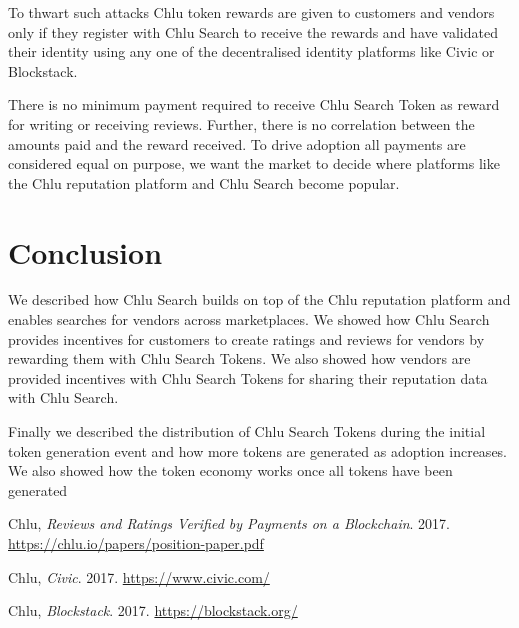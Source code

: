 \documentclass[a4paper]{article}
\begin{document}
To thwart such attacks Chlu token rewards are given to customers and
vendors only if they register with Chlu Search to receive the rewards
and have validated their identity using any one of the decentralised
identity platforms like Civic\cite{civic} or
Blockstack\cite{blockstack}.

There is no minimum payment required to receive Chlu Search Token as
reward for writing or receiving reviews. Further, there is no
correlation between the amounts paid and the reward received. To drive
adoption all payments are considered equal on purpose, we want the
market to decide where platforms like the Chlu reputation platform and
Chlu Search become popular.

\section{Conclusion}

We described how Chlu Search builds on top of the Chlu reputation
platform and enables searches for vendors across marketplaces. We
showed how Chlu Search provides incentives for customers to create
ratings and reviews for vendors by rewarding them with Chlu Search
Tokens. We also showed how vendors are provided incentives with Chlu
Search Tokens for sharing their reputation data with Chlu Search.

Finally we described the distribution of Chlu Search Tokens during the
initial token generation event and how more tokens are generated as
adoption increases. We also showed how the token economy works once
all tokens have been generated

\medskip
 
\begin{thebibliography}{9}

 Chlu, \textit{Reviews and Ratings Verified
  by Payments on a Blockchain}. 2017.
  \url{https://chlu.io/papers/position-paper.pdf}

 Chlu, \textit{Civic}. 2017.
  \url{https://www.civic.com/}

 Chlu, \textit{Blockstack}. 2017.
  \url{https://blockstack.org/}
  
\end{thebibliography}
\end{document}
